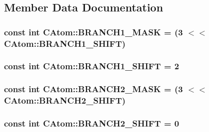 \subsection{Member Data Documentation}
\hypertarget{classCAtom_a0abe41c8fd1d3c1d0a19cad9e44427b1}{
\subsubsection[{B\-R\-A\-N\-C\-H1\-\_\-\-M\-A\-S\-K}]{\setlength{\rightskip}{0pt plus 5cm}const int C\-Atom\-::\-B\-R\-A\-N\-C\-H1\-\_\-\-M\-A\-S\-K = (3 $<$$<$ {\bf C\-Atom\-::\-B\-R\-A\-N\-C\-H1\-\_\-\-S\-H\-I\-F\-T})\hspace{0.3cm}{\ttfamily [static]}}}\label{classCAtom_a0abe41c8fd1d3c1d0a19cad9e44427b1}
\hypertarget{classCAtom_a1681cf237fc69b41f3cd19883b0d95f9}{
\subsubsection[{B\-R\-A\-N\-C\-H1\-\_\-\-S\-H\-I\-F\-T}]{\setlength{\rightskip}{0pt plus 5cm}const int C\-Atom\-::\-B\-R\-A\-N\-C\-H1\-\_\-\-S\-H\-I\-F\-T = 2\hspace{0.3cm}{\ttfamily [static]}}}\label{classCAtom_a1681cf237fc69b41f3cd19883b0d95f9}
\hypertarget{classCAtom_a5c11499e3e68349fd7e83369a5939319}{
\subsubsection[{B\-R\-A\-N\-C\-H2\-\_\-\-M\-A\-S\-K}]{\setlength{\rightskip}{0pt plus 5cm}const int C\-Atom\-::\-B\-R\-A\-N\-C\-H2\-\_\-\-M\-A\-S\-K = (3 $<$$<$ {\bf C\-Atom\-::\-B\-R\-A\-N\-C\-H2\-\_\-\-S\-H\-I\-F\-T})\hspace{0.3cm}{\ttfamily [static]}}}\label{classCAtom_a5c11499e3e68349fd7e83369a5939319}
\hypertarget{classCAtom_a1932c279f682ca9a43d653ec5afae175}{
\subsubsection[{B\-R\-A\-N\-C\-H2\-\_\-\-S\-H\-I\-F\-T}]{\setlength{\rightskip}{0pt plus 5cm}const int C\-Atom\-::\-B\-R\-A\-N\-C\-H2\-\_\-\-S\-H\-I\-F\-T = 0\hspace{0.3cm}{\ttfamily [static]}}}\label{classCAtom_a1932c279f682ca9a43d653ec5afae175}
